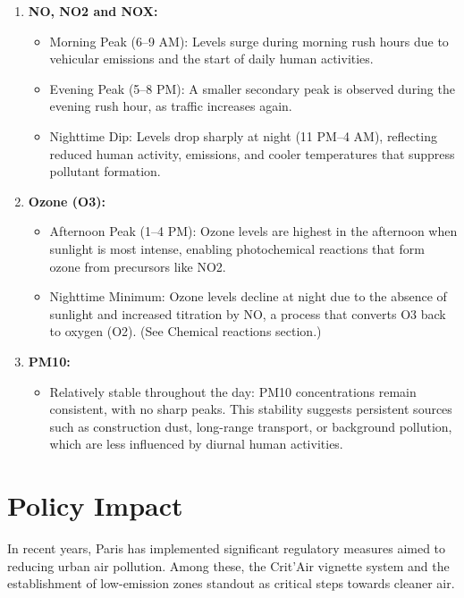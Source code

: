 \documentclass{modeleRapport}
\begin{document}
\begin{enumerate}
    \item \textbf{NO, NO2 and NOX:}
    \begin{itemize}
        \item Morning Peak (6–9 AM): Levels surge during morning rush hours due to vehicular emissions and the 
        start of daily human activities.
        \item Evening Peak (5–8 PM): A smaller secondary peak is observed during the evening rush hour, as traffic increases again.
        \item Nighttime Dip: Levels drop sharply at night (11 PM–4 AM), reflecting reduced human activity, emissions, and cooler temperatures 
        that suppress pollutant formation.\\
    \end{itemize}
    \item \textbf{Ozone (O3):}
    \begin{itemize}
        \item Afternoon Peak (1–4 PM): Ozone levels are highest in the afternoon when sunlight is most intense, enabling photochemical 
        reactions that form ozone from precursors like NO2.
        \item Nighttime Minimum: Ozone levels decline at night due to the absence of sunlight and increased titration by NO, 
        a process that converts O3 back to oxygen (O2). (See Chemical reactions section.)\\
    \end{itemize}
    \item \textbf{PM10:}
    \begin{itemize}
        \item Relatively stable throughout the day: PM10 concentrations remain consistent, with no sharp peaks. 
        This stability suggests persistent sources such as construction dust, long-range transport, or background pollution, which are less 
        influenced by diurnal human activities.\\
    \end{itemize}
\end{enumerate}

\section{Policy Impact}

In recent years, Paris has implemented significant regulatory measures aimed to reducing urban air pollution. 
Among these, the Crit’Air vignette system and the establishment of low-emission zones standout as critical steps 
towards cleaner air.\\
\end{document}
